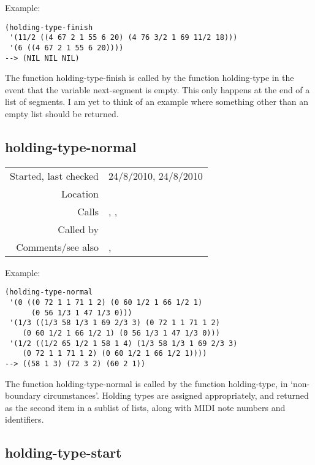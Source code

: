 \vspace{0.5cm}
\noindent Example:
\begin{verbatim}
(holding-type-finish
 '(11/2 ((4 67 2 1 55 6 20) (4 76 3/2 1 69 11/2 18)))
 '(6 ((4 67 2 1 55 6 20))))
--> (NIL NIL NIL)
\end{verbatim}

\noindent The function holding-type-finish is called
by the function holding-type in the event that the
variable next-segment is empty. This only happens at
the end of a list of segments. I am yet to think of an
example where something other than an empty list
should be returned.


\subsection*{holding-type-normal}\label{fun:holding-type-normal}

\vspace{0.3cm}
\begin{tabular}{r|p{8cm}}
Started, last checked & 24/8/2010, 24/8/2010 \\
Location & \nameref{sec:spacing-states} \\
Calls & \nameref{fun:index-item-1st-occurs}, \nameref{fun:my-last},\newline \nameref{fun:nth-list-of-lists} \\
Called by & \nameref{fun:holding-type} \\
Comments/see also & \nameref{fun:holding-type-finish}, \nameref{fun:holding-type-start}
\end{tabular}

\vspace{0.5cm}
\noindent Example:
\begin{verbatim}
(holding-type-normal
 '(0 ((0 72 1 1 71 1 2) (0 60 1/2 1 66 1/2 1)
      (0 56 1/3 1 47 1/3 0)))
 '(1/3 ((1/3 58 1/3 1 69 2/3 3) (0 72 1 1 71 1 2)
	(0 60 1/2 1 66 1/2 1) (0 56 1/3 1 47 1/3 0)))
 '(1/2 ((1/2 65 1/2 1 58 1 4) (1/3 58 1/3 1 69 2/3 3)
	(0 72 1 1 71 1 2) (0 60 1/2 1 66 1/2 1))))
--> ((58 1 3) (72 3 2) (60 2 1))
\end{verbatim}

\noindent The function holding-type-normal is called
by the function holding-type, in `non-boundary
circumstances'. Holding types are assigned
appropriately, and returned as the second item in a
sublist of lists, along with MIDI note numbers and
identifiers.


\subsection*{holding-type-start}\label{fun:holding-type-start}


